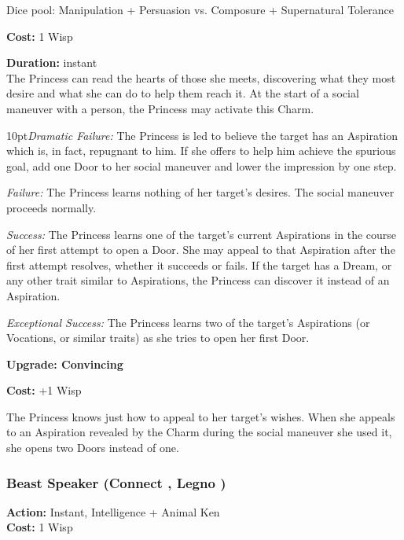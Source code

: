 \noindent Dice pool: Manipulation + Persuasion vs. Composure + Supernatural Tolerance

\noindent \textbf{Cost:} 1 Wisp

\noindent \textbf{Duration:} instant\\

The Princess can read the hearts of those she meets, discovering what they most desire and what she can do to help them reach it. At the start of a social maneuver with a person, the Princess may activate this Charm.

\begin{myindentpar}{10pt}\emph{Dramatic Failure:}  The Princess is led to believe the target has an Aspiration which is, in fact, repugnant to him. If she offers to help him achieve the spurious goal, add one Door to her social maneuver and lower the impression by one step.
 
\emph{Failure:} The Princess learns nothing of her target’s desires. The social maneuver proceeds normally.

\emph{Success:} The Princess learns one of the target’s current Aspirations in the course of her first attempt to open a Door. She may appeal to that Aspiration after the first attempt resolves, whether it succeeds or fails. If the target has a Dream, or any other trait similar to Aspirations, the Princess can discover it instead of an Aspiration.

\emph{Exceptional Success:} The Princess learns two of the target’s Aspirations (or Vocations, or similar traits) as she tries to open her first Door.

\textbf{Upgrade: Convincing}

\noindent \textbf{Cost:} +1 Wisp

The Princess knows just how to appeal to her target’s wishes. When she appeals to an Aspiration revealed by the Charm during the social maneuver she used it, she opens two Doors instead of one.
\end{myindentpar}

\subsubsection*{Beast Speaker (Connect \textbullet\textbullet, Legno \textbullet)}

\noindent \textbf{Action:} Instant, Intelligence + Animal Ken\\

\noindent \textbf{Cost:} 1 Wisp\\

